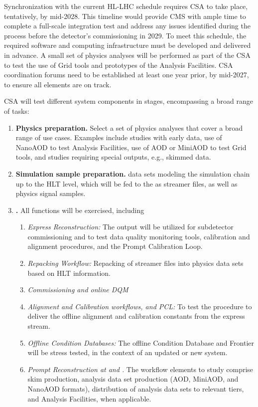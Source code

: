 Synchronization with the current \gls{HL-LHC} schedule requires \gls{CSA} to take place, tentatively, by mid-2028. This timeline would provide CMS with ample time to complete a full-scale integration test and address any issues identified during the process before the detector’s commissioning in 2029. To meet this schedule, the required software and computing infrastructure must be developed and delivered in advance. A small set of physics analyses will be performed as part of the \gls{CSA} to test the use of Grid tools and prototypes of the Analysis Facilities. \gls{CSA} coordination forums need to be established at least one year prior, by mid-2027, to ensure all elements are on track.

\gls{CSA} will test different system components in stages, encompassing a broad range of tasks:
\begin{enumerate}
    \item \textbf{Physics preparation.} Select a set of physics analyses that cover a broad range of use cases. Examples include studies with early data, use of NanoAOD to test Analysis Facilities, use of \gls{AOD} or MiniAOD to test Grid tools, and studies requiring special outputs, e.g., skimmed data.
    \item \textbf{Simulation sample preparation.} data sets modeling the simulation chain up to the \gls{HLT} level, which will be fed to the \TierZero as streamer files, as well as physics signal samples.
    \item \textbf{\TierZero.} All \TierZero functions will be exercised, including
    \begin{enumerate}
        \item \textit{Express Reconstruction:} The output will be utilized for subdetector commissioning and to test data quality monitoring tools, calibration and alignment procedures, and the Prompt Calibration Loop.
        \item \textit{Repacking Workflow:} Repacking of streamer files into physics data sets based on \gls{HLT} information.
        \item \textit{Commissioning and online \gls{DQM}}
        \item \textit{Alignment and Calibration workflows, and \gls{PCL}:} To test the procedure to deliver the offline alignment and calibration constants from the express stream.
        \item \textit{Offline Condition Databases:} The offline Condition Database and Frontier will be stress tested, in the context of an updated or new system.
        \item \textit{Prompt Reconstruction at \TierZero and \TierOne.} The workflow elements to study comprise skim production, analysis data set production (\gls{AOD}, MiniAOD, and NanoAOD formats), distribution of analysis data sets to relevant tiers, and Analysis Facilities, when applicable.
     

\end{enumerate}
\end{enumerate}
